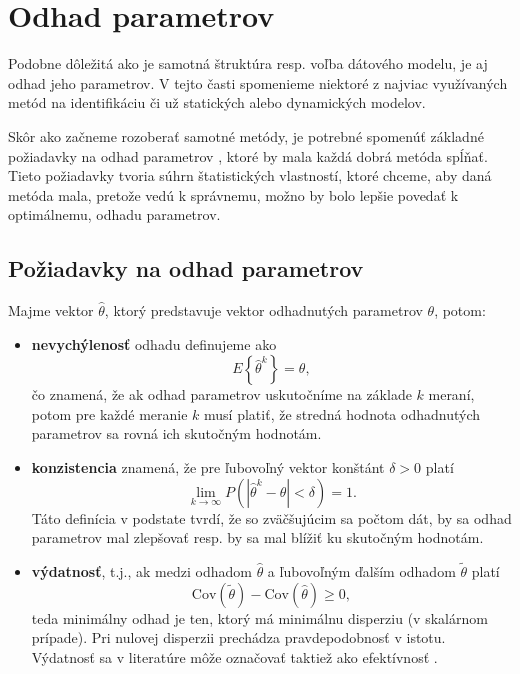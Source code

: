 \section{Odhad parametrov}
Podobne dôležitá ako je samotná štruktúra resp. voľba dátového modelu, je aj odhad jeho parametrov. V tejto časti spomenieme niektoré z najviac využívaných metód na identifikáciu či už statických alebo dynamických modelov. 

Skôr ako začneme rozoberať samotné metódy, je potrebné spomenúť základné požiadavky na odhad parametrov \cite{beck:param_est:1977}, ktoré by mala každá dobrá metóda spĺňať. Tieto požiadavky tvoria súhrn štatistických vlastností, ktoré chceme, aby daná metóda mala, pretože vedú k správnemu, možno by bolo lepšie povedať k optimálnemu, odhadu parametrov.

\subsection{Požiadavky na odhad parametrov}
Majme vektor $ \hat{\theta} $, ktorý predstavuje vektor odhadnutých parametrov $ \theta $, potom:
\begin{itemize}
	\item[] \textbf{nevychýlenosť} odhadu definujeme ako
	\begin{equation*}
		E\left\lbrace \hat{\theta}^k \right\rbrace = \theta, 
	\end{equation*}
	čo znamená, že ak odhad parametrov uskutočníme na základe $ k $ meraní, potom pre každé meranie $ k $ musí platiť, že stredná hodnota odhadnutých parametrov sa rovná ich skutočným hodnotám.
	\item[] \textbf{konzistencia} znamená, že pre ľubovoľný vektor konštánt $ \delta > 0 $ platí
	\begin{equation*}
		\lim\limits_{k \rightarrow \infty} P \left( \left| \hat{\theta}^k - \theta \right| < \delta \right) = 1. 
	\end{equation*}
	Táto definícia v podstate tvrdí, že so zväčšujúcim sa počtom dát, by sa odhad parametrov mal zlepšovať resp. by sa mal blížiť ku skutočným hodnotám.
	\item[] \textbf{výdatnosť}, t.j., ak medzi odhadom $ \hat{\theta} $ a ľubovoľným ďalším odhadom $ \tilde{\theta} $ platí 
	\begin{equation*}
		\text{Cov} \left( \tilde{\theta} \right) - \text{Cov} \left( \hat{\theta} \right) \geq 0,
	\end{equation*}
	teda minimálny odhad je ten, ktorý má minimálnu disperziu (v skalárnom prípade). Pri nulovej disperzii prechádza pravdepodobnosť v istotu. Výdatnosť sa v literatúre môže označovať taktiež ako efektívnosť \citealp*{beck:param_est:1977}.
\end{itemize}

